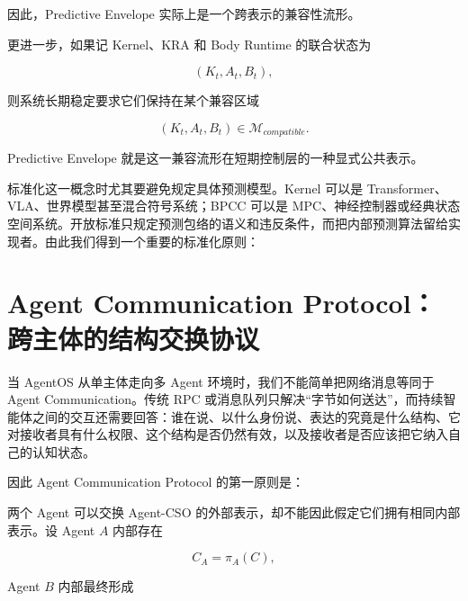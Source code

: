 \begin{statementbox}
\centering
{}
\end{statementbox}

因此，Predictive Envelope 实际上是一个跨表示的兼容性流形。

更进一步，如果记 Kernel、KRA 和 Body Runtime 的联合状态为

\[
(K_t,A_t,B_t),
\]

则系统长期稳定要求它们保持在某个兼容区域

\[
(K_t,A_t,B_t)
\in
\mathcal M_{compatible}.
\]

Predictive Envelope 就是这一兼容流形在短期控制层的一种显式公共表示。

标准化这一概念时尤其要避免规定具体预测模型。Kernel 可以是 Transformer、VLA、世界模型甚至混合符号系统；BPCC 可以是 MPC、神经控制器或经典状态空间系统。开放标准只规定预测包络的语义和违反条件，而把内部预测算法留给实现者。由此我们得到一个重要的标准化原则：

\begin{statementbox}
\centering
{}
\end{statementbox}

\section{Agent Communication Protocol：跨主体的结构交换协议}

当 AgentOS 从单主体走向多 Agent 环境时，我们不能简单把网络消息等同于 Agent Communication。传统 RPC 或消息队列只解决``字节如何送达''，而持续智能体之间的交互还需要回答：谁在说、以什么身份说、表达的究竟是什么结构、它对接收者具有什么权限、这个结构是否仍然有效，以及接收者是否应该把它纳入自己的认知状态。

因此 Agent Communication Protocol 的第一原则是：

\begin{statementbox}
\centering
{}
\end{statementbox}

两个 Agent 可以交换 Agent-CSO 的外部表示，却不能因此假定它们拥有相同内部表示。设 Agent $A$ 内部存在

\[
C_A=\pi_A(C),
\]

Agent $B$ 内部最终形成

